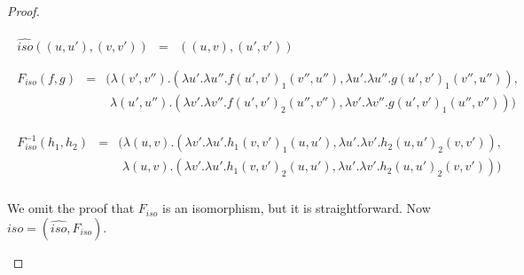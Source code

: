 \begin{proof}
\begin{report}
\begin{itemize}
\begin{center}
\begin{math}
\begin{array}{lll}
\begin{array}{rll}
            \hat{iso}((u,u'),(v,v')) & = & ((u,v),(u',v'))
          \end{array}\\\\        
          \begin{array}{rll}            
            F_{iso}(f,g) & = & (\lambda (v',v'').(\lambda u'.\lambda u''.f(u',v')_1(v'',u''),\lambda u'.\lambda u''.g(u',v')_1(v'',u'')),\\
            && \,\,\lambda (u',u'').(\lambda v'.\lambda v''.f(u',v')_2(u'',v''),\lambda v'.\lambda v''.g(u',v')_1(u'',v'')))\\
          \end{array}\\\\
          \begin{array}{rll}
            F_{iso}^{-1}(h_1,h_2) & = & (\lambda (u,v).(\lambda v'.\lambda u'.h_1(v,v')_1(u,u'),\lambda u'.\lambda v'.h_2(u,u')_2(v,v')),\\
            && \,\,\lambda (u,v).(\lambda v'.\lambda u'.h_1(v,v')_2(u,u'),\lambda u'.\lambda v'.h_2(u,u')_2(v,v')))\\
          \end{array}
        \end{array}
      \end{math}
    \end{center}
    We omit the proof that $F_{iso}$ is an isomorphism, but it is
    straightforward.  Now $iso = (\hat{iso},F_{iso})$.


\end{itemize}
\end{report}
\end{proof}
